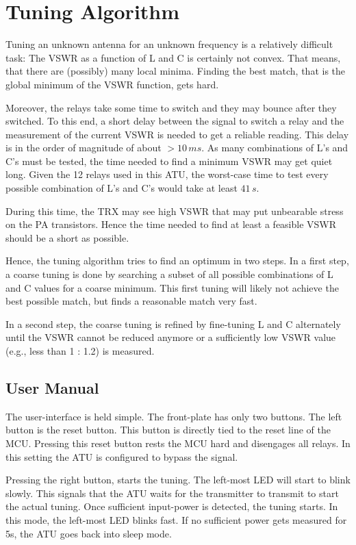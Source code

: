 \documentclass[10pt, a4paper,twoside]{scrartcl}
\begin{document}
\section{Tuning Algorithm}
Tuning an unknown antenna for an unknown frequency is a relatively difficult task: The VSWR as a function of L and C is certainly not convex. That means, that there are (possibly) many local minima. Finding the best match, that is the global minimum of the VSWR function, gets hard. 

Moreover, the relays take some time to switch and they may bounce after they switched. To this end, a short delay between the signal to switch a relay and the measurement of the current VSWR is needed to get a reliable reading. This delay is in the order of magnitude of about $> 10\,ms$. As many combinations of L's and C's must be tested, the time needed to find a minimum VSWR may get quiet long. Given the 12 relays used in this ATU, the worst-case time to test every possible combination of L's and C's would take at least $41\,s$. 

During this time, the TRX may see high VSWR that may put unbearable stress on the PA transistors. Hence the time needed to find at least a feasible VSWR should be a short as possible. 

Hence, the tuning algorithm tries to find an optimum in two steps. In a first step, a coarse tuning is done by searching a subset of all possible combinations of L and C values for a coarse minimum. This first tuning will likely not achieve the best possible match, but finds a reasonable match very fast.

In a second step, the coarse tuning is refined by fine-tuning L and C alternately until the VSWR cannot be reduced anymore or a sufficiently low VSWR value (e.g., less than 1 : 1.2) is measured.

\subsection{User Manual}
The user-interface is held simple. The front-plate has only two buttons. The left button is the reset button. This button is directly tied to the reset line of the MCU. Pressing this reset button rests the MCU hard and disengages all relays. In this setting the ATU is configured to bypass the signal. 

Pressing the right button, starts the tuning. The left-most LED will start to blink slowly. This signals that the ATU waits for the transmitter to transmit to start the actual tuning. Once sufficient input-power is detected, the tuning starts. In this mode, the left-most LED blinks fast. If no sufficient power gets measured for 5s, the ATU goes back into sleep mode. 
\end{document}
